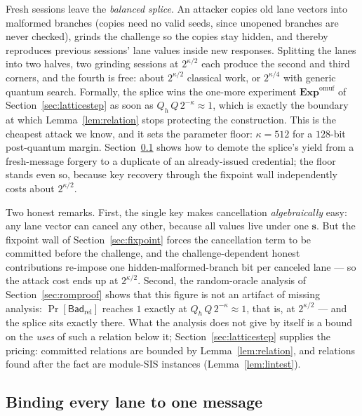 \documentclass[11pt]{article}
\newcommand{\Exp}{\mathbf{Exp}}
\newcommand{\Bad}{\mathsf{Bad}}
\begin{document}
Fresh sessions leave the \emph{balanced splice}.  An attacker copies old
lane vectors into malformed branches (copies need no valid seeds, since
unopened branches are never checked), grinds the challenge so the copies stay
hidden, and thereby reproduces previous sessions' lane values inside new
responses.  Splitting the lanes into two halves, two grinding sessions at
$2^{\kappa/2}$ each produce the second and third corners, and the fourth is
free: about $2^{\kappa/2}$ classical work, or $2^{\kappa/4}$ with generic
quantum search.  Formally, the splice wins the one-more experiment
$\Exp^{\mathrm{omuf}}$ of Section~\ref{sec:latticestep} as soon as
$Q_h\,Q\,2^{-\kappa}\approx1$, which is exactly the boundary at which
Lemma~\ref{lem:relation} stops protecting the construction.  This is the
cheapest attack we know, and it sets the parameter floor: $\kappa=512$ for a
$128$-bit post-quantum margin.
Section~\ref{sec:commonmessage} shows how to demote the splice's yield from
a fresh-message forgery to a duplicate of an already-issued credential; the
floor stands even so, because key recovery through the fixpoint wall
independently costs about $2^{\kappa/2}$.

Two honest remarks.  First, the single key makes cancellation
\emph{algebraically} easy: any lane vector can cancel any other, because all
values live under one $\mathbf s$.  But the fixpoint wall of
Section~\ref{sec:fixpoint} forces the cancellation term to be committed
before the challenge, and the challenge-dependent honest contributions
re-impose one hidden-malformed-branch bit per canceled lane --- so the attack
cost ends up at $2^{\kappa/2}$.  Second, the random-oracle analysis of
Section~\ref{sec:romproof} shows that this figure is not an artifact of
missing analysis: $\Pr[\Bad_{\mathrm{rel}}]$ reaches $1$ exactly at
$Q_h\,Q\,2^{-\kappa}\approx1$, that is, at $2^{\kappa/2}$ --- and the splice
sits exactly there.  What the analysis does not give by itself is a bound on
the \emph{uses} of such a relation below it; Section~\ref{sec:latticestep}
supplies the pricing: committed relations are bounded by
Lemma~\ref{lem:relation}, and relations found after the fact are module-SIS
instances (Lemma~\ref{lem:lintest}).

\subsection{Binding every lane to one message}
\label{sec:commonmessage}
\end{document}
